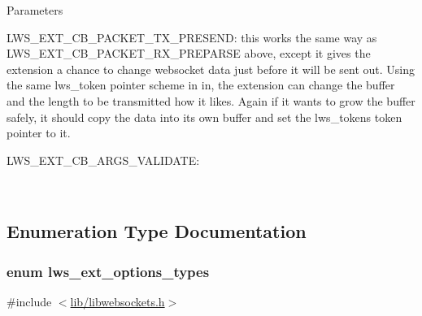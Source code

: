 \begin{DoxyParams}{Parameters}
\begin{DoxyVerb}
 LWS_EXT_CB_PACKET_TX_PRESEND: this works the same way as
    LWS_EXT_CB_PACKET_RX_PREPARSE above, except it gives the
    extension a chance to change websocket data just before it will
    be sent out.  Using the same lws_token pointer scheme in in,
    the extension can change the buffer and the length to be
    transmitted how it likes.  Again if it wants to grow the
    buffer safely, it should copy the data into its own buffer and
    set the lws_tokens token pointer to it.

 LWS_EXT_CB_ARGS_VALIDATE:\end{DoxyVerb}
 \\
\hline
\end{DoxyParams}


\subsection{Enumeration Type Documentation}
\subsubsection[{\texorpdfstring{lws\+\_\+ext\+\_\+options\+\_\+types}{lws\_ext\_options\_types}}]{\setlength{\rightskip}{0pt plus 5cm}enum {\bf lws\+\_\+ext\+\_\+options\+\_\+types}}\hypertarget{group__extensions_gacc9f55936dc165257a2e1f7d47bce89e}{}\label{group__extensions_gacc9f55936dc165257a2e1f7d47bce89e}


{\ttfamily \#include $<$\hyperlink{libwebsockets_8h}{lib/libwebsockets.\+h}$>$}

